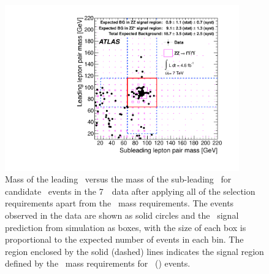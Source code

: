  \begin{figure}[htbp]
 \begin{center}
  \includegraphics[width=0.9\textwidth]{7TeV/h_mz1_mz2.pdf}\hfill
  \caption[Mass of the leading \leppair\ versus the mass of the
  sub-leading \leppair\ for candidate \ZZ\ events in the 7~\tev\ data, after applying all of the selection
  requirements apart from the \dilepton\ mass requirements .]
  {\small Mass of the leading \leppair\ versus the mass of the
  sub-leading \leppair\ for candidate \ZZ\ events in the 7~\tev\ data after
  applying all of the selection
  requirements apart from the \dilepton\ mass requirements.
  The events observed in the data are shown as solid circles and the \ZZsllll\
  signal prediction from simulation as boxes,
  with the size of each box is proportional to the expected number of events in each bin.  
  The region enclosed by the solid (dashed) lines indicates the signal region defined by the
  \dilepton\ mass requirements for \ZZ\ (\ZZs) events.
   }
    \label{fig:zzdists-Zmass2D-seven}
 \end{center}
 \end{figure}

